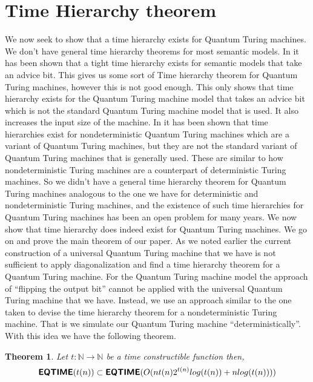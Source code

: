 \documentclass[11pt,a4paper]{article}
\newtheorem{theorem}{Theorem}
\newcommand{\classX}[1]{\ensuremath{\text{\textsf{\textbf{#1}}}}}
\newcommand{\EQ}{\classX{EQTIME}}
\begin{document}
\section{Time Hierarchy theorem}
    We now seek to show that a time hierarchy exists for Quantum Turing machines. We don't have general time hierarchy theorems for most semantic models.
    In \cite{3} it has been shown that a tight time hierarchy exists for semantic models that take an advice bit. This gives us some sort of Time hierarchy theorem for Quantum Turing machines, however this is not good enough.
    This only shows that time hierarchy exists for the Quantum Turing machine model that takes an advice bit which is not the standard Quantum Turing machine model that is used. 
    It also increases the input size of the machine. In \cite{18} it has been shown that time hierarchies exist for nondeterministic Quantum Turing machines which are a variant of Quantum Turing machines, but they are not the standard variant of Quantum Turing machines that is generally used.
    These are similar to how nondeterministic Turing machines are a counterpart of deterministic Turing machines. So we didn't have a general time hierarchy theorem for Quantum Turing machines analogous to the one we have for deterministic and nondeterministic Turing machines, and the existence of such time hierarchies for Quantum Turing machines has been an open problem for many years.
    We now show that time hierarchy does indeed exist for Quantum Turing machines. We go on and prove the main theorem of our paper.
    As we noted earlier the current construction of a universal Quantum Turing machine that we have is not sufficient to apply diagonalization and find a time hierarchy theorem for a Quantum Turing machine.
    For the Quantum Turing machine model the approach of ``flipping the output bit'' cannot be applied with the universal Quantum Turing machine that we have. Instead, we use an approach similar to the one taken to devise the time hierarchy theorem for a nondeterministic Turing machine.
    That is we simulate our Quantum Turing machine ``deterministically''. With this idea we have the following theorem.
    \begin{theorem}
        Let $t:\mathbb{N} \to \mathbb{N}$ be a time constructible function then, 
        $$\EQ(t(n)) \subset \EQ(O(nt(n)2^{t(n)}log(t(n))+nlog(t(n))))$$
    \end{theorem}
\end{document}
